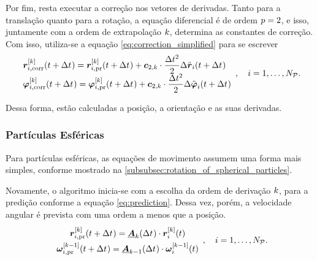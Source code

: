 Por fim, resta executar a correção nos vetores de derivadas. Tanto para a translação quanto para a rotação, a equação diferencial é de ordem \(p = 2\), e isso, juntamente com a ordem de extrapolação \(k\), determina as constantes de correção. Com isso, utiliza-se a equação \eqref{eq:correction_simplified} para se escrever	
\begin{equation*}
	\def\arraystretch{1.5}
	\begin{array}{l}
		\drvec{\taylorOrder}{\positionicorr}\pqty{t+\Dt} = \drvec{\taylorOrder}{\positionipr}\pqty{t+\Dt} + \correctorConstantVector{\taylorOrder}{2}\cdot\dfrac{\Dt^2}{2}\Delta \accelerationi\pqty{t+\Dt} \\
		\drvec{\taylorOrder}{\orientationicorr}\pqty{t+\Dt} = \drvec{\taylorOrder}{\orientationipr}\pqty{t+\Dt} + \correctorConstantVector{\taylorOrder}{2}\cdot\dfrac{\Dt^2}{2}\Delta \dorientationi{2}\pqty{t+\Dt}
	\end{array}, \quad i = 1, \dotsc, \numberOfParticles.
\end{equation*}

Dessa forma, estão calculadas a posição, a orientação e as suas derivadas.

\subsubsection*{Partículas Esféricas}

Para partículas esféricas, as equações de movimento assumem uma forma mais simples, conforme mostrado na \autoref{subsubsec:rotation_of_spherical_particles}. 

Novamente, o algoritmo inicia-se com a escolha da ordem de derivação \(k\), para a predição conforme a equação \eqref{eq:prediction}. Dessa vez, porém, a velocidade angular é prevista com uma ordem a menos que a posição.
\begin{equation*}
	\def\arraystretch{1.5}
	\begin{array}{c}
		\drvec{\taylorOrder}{\positionipr}\pqty{t+\Dt} = \extrapolationMatrix{\taylorOrder}[\Dt]\cdot\drvec{\taylorOrder}{\positioni}\pqty{t} \\
		\drvec{\taylorOrder-1}{\angularVelocityipr}\pqty{t+\Dt} = \extrapolationMatrix{\taylorOrder-1}[\Dt]\cdot\drvec{\taylorOrder-1}{\angularVelocityi}\pqty{t} \\
	\end{array}, \quad i = 1, \dotsc, \numberOfParticles.
\end{equation*}

